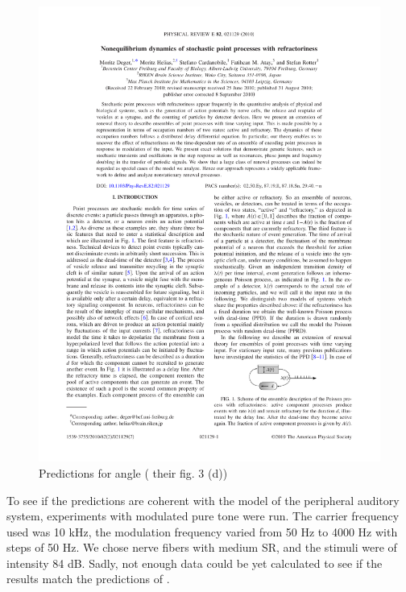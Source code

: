 \begin{figure}[h]
	\centering
	\includegraphics*[page=4,viewport=433 567 566 617]{images/Deger2010.pdf} %
	\caption{Predictions for angle (\cite{Deger} their fig. 3 (d))}
	\label{fig:predangle}
\end{figure}

To see if the predictions are coherent with the model of the peripheral auditory 
system, experiments with modulated pure tone were run. 
The carrier frequency used was 10 kHz, the modulation frequency varied from 50 Hz to 4000 Hz
with steps of 50 Hz. We chose nerve fibers with medium SR, 
and the stimuli were of intensity 84 dB. 
Sadly, not enough data could be yet calculated to see if the results match the predictions of 
\cite{Deger}.









 